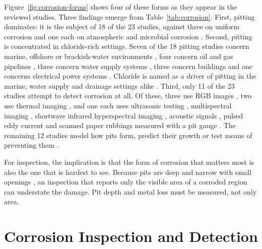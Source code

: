 Figure~\ref{fig:corrosion-forms} shows four of these forms as they appear in the
reviewed studies. Three findings emerge from Table~\ref{tab:corrosion}. First, pitting dominates:
it is the subject of 18 of the 23 studies, against three on uniform corrosion
\citep{Khodabux2020,Yang2025,Yang2026a} and one each on atmospheric \citep{DeKerf2022} and microbial corrosion \citep{Liang2021}.
Second, pitting is concentrated in chloride-rich settings. Seven of the 18
pitting studies concern marine, offshore or brackish-water environments
\citep{Liu2026,Wang2021,Khodabux2021,Nugroho2021,Mao2026,Khodabux2021a,Suzuki2026}, four concern oil and gas pipelines
\citep{Akhlaghi2023,Arzaghi2020,Malashin2024,Huang2026a}, three concern water supply systems \citep{Li2022,Nguyen2026,Liu2021}, three concern
buildings \citep{Elizalde2023,Qin2026,Egodawela2025} and one concerns electrical power systems \citep{Wojciechowski2025}.
Chloride is named as a driver of pitting in the marine, water supply and
drainage settings alike \citep{Liu2026,Li2022,Nguyen2026,Suzuki2026,Khodabux2021a}. Third, only 11 of the 23 studies
attempt to detect corrosion at all. Of these, three use RGB images
\citep{Malashin2024,Mao2026,Suzuki2026}, two use thermal imaging \citep{Elizalde2023,Liu2021}, and one each uses ultrasonic
testing \citep{Huang2026a}, multispectral imaging \citep{Egodawela2025}, shortwave infrared
hyperspectral imaging \citep{DeKerf2022}, acoustic signals \citep{Yang2026a}, pulsed eddy current
\citep{Yang2025} and scanned paper rubbings measured with a pit gauge \citep{Khodabux2021a}. The remaining
12 studies model how pits form, predict their growth or test means of preventing
them \citep{Liu2026,Li2022,Nguyen2026,Wang2021,Qin2026,Akhlaghi2023,Wojciechowski2025,Khodabux2020,Liang2021,Khodabux2021,Nugroho2021,Arzaghi2020}.

For inspection, the implication is that the form of corrosion that matters most
is also the one that is hardest to see. Because pits are deep and narrow with
small openings \citep{Soares2023}, an inspection that reports only the visible area of a
corroded region can understate the damage. Pit depth and metal loss must be
measured, not only area.

\section{Corrosion Inspection and Detection}
\label{sec:lr-corrosion-detection}

